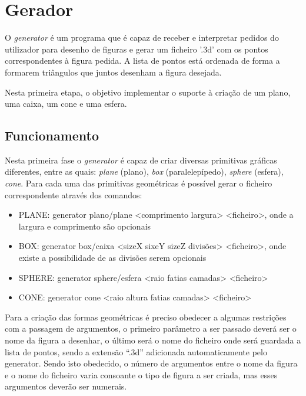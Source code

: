 \chapter{Gerador}
\label{cap:p1}


O \textit{generator} é um programa que é capaz de receber e interpretar pedidos do utilizador para desenho de figuras e gerar um ficheiro '.3d' com os pontos correspondentes à figura pedida. A lista de pontos está ordenada de forma a formarem triângulos que juntos desenham a figura desejada. 

Nesta primeira etapa, o objetivo implementar o suporte à criação de um plano, uma caixa, um cone e uma esfera. 


\section{Funcionamento}

Nesta primeira fase o \textit{generator} é capaz de criar diversas primitivas gráficas
diferentes, entre as quais: \textit{plane} (plano), \textit{box} (paralelepípedo), \textit{sphere} (esfera), \textit{cone}. Para cada uma das primitivas geométricas é possível gerar o ficheiro correspondente através dos comandos:

\begin{itemize}
	\item PLANE: generator plano/plane <comprimento largura> <ficheiro>, onde a largura e comprimento são opcionais 
	
	\item BOX: generator box/caixa <sizeX sixeY sizeZ divisões> <ficheiro>, onde existe a possibilidade de as divisões serem opcionais
	
	\item SPHERE: generator sphere/esfera <raio fatias camadas> <ficheiro>
	
	\item CONE: generator cone <raio altura fatias camadas> <ficheiro>
	
\end{itemize}


Para a criação das formas geométricas é preciso obedecer a algumas restrições
com a passagem de argumentos, o primeiro parâmetro a ser passado deverá
ser o nome da figura a desenhar, o último será o nome do ficheiro onde será
guardada a lista de pontos, sendo a extensão “.3d” adicionada automaticamente
pelo generator. Sendo isto obedecido, o número de argumentos entre
o nome da figura e o nome do ficheiro varia consoante o tipo de figura a ser
criada, mas esses argumentos deverão ser numerais.


